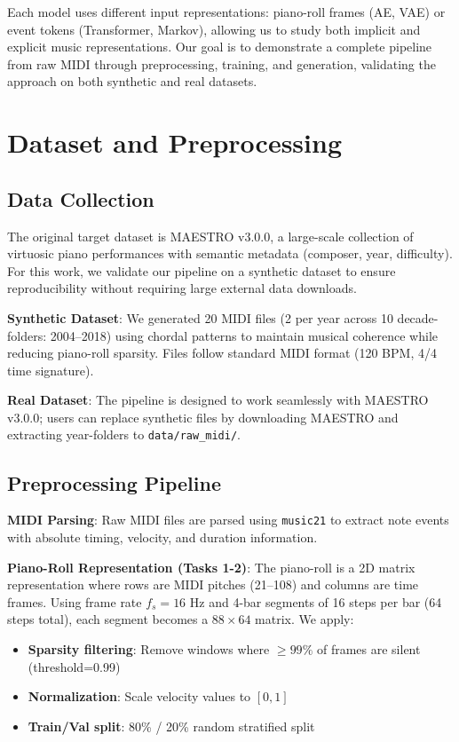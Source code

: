 \documentclass[conference]{IEEEtran}
\begin{document}
Each model uses different input representations: piano-roll frames (AE, VAE) or event tokens (Transformer, Markov), allowing us to study both implicit and explicit music representations. Our goal is to demonstrate a complete pipeline from raw MIDI through preprocessing, training, and generation, validating the approach on both synthetic and real datasets.

\section{Dataset and Preprocessing}
\subsection{Data Collection}
The original target dataset is MAESTRO v3.0.0, a large-scale collection of virtuosic piano performances with semantic metadata (composer, year, difficulty). For this work, we validate our pipeline on a synthetic dataset to ensure reproducibility without requiring large external data downloads.

\textbf{Synthetic Dataset}: We generated 20 MIDI files (2 per year across 10 decade-folders: 2004--2018) using chordal patterns to maintain musical coherence while reducing piano-roll sparsity. Files follow standard MIDI format (120 BPM, 4/4 time signature).

\textbf{Real Dataset}: The pipeline is designed to work seamlessly with MAESTRO v3.0.0; users can replace synthetic files by downloading MAESTRO and extracting year-folders to \texttt{data/raw\_midi/}.

\subsection{Preprocessing Pipeline}
\textbf{MIDI Parsing}: Raw MIDI files are parsed using \texttt{music21} to extract note events with absolute timing, velocity, and duration information.

\textbf{Piano-Roll Representation (Tasks 1-2)}: 
The piano-roll is a 2D matrix representation where rows are MIDI pitches (21--108) and columns are time frames. Using frame rate $f_s = 16$ Hz and 4-bar segments of 16 steps per bar (64 steps total), each segment becomes a $88 \times 64$ matrix. We apply:
\begin{itemize}
    \item \textbf{Sparsity filtering}: Remove windows where $\geq 99\%$ of frames are silent (threshold=0.99)
    \item \textbf{Normalization}: Scale velocity values to $[0, 1]$
    \item \textbf{Train/Val split}: 80\% / 20\% random stratified split
\end{itemize}
\end{document}
